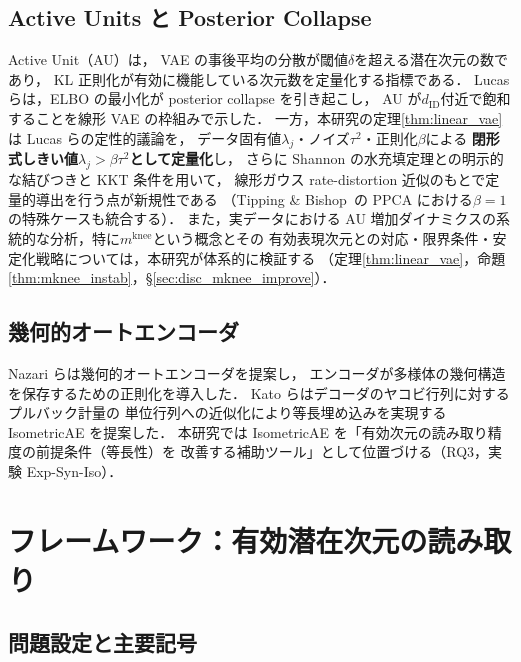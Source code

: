\documentclass[11pt,a4paper]{jsarticle}
\newcommand{\mknee}{m^{\mathrm{knee}}}
\begin{document}
\subsection{Active Units と Posterior Collapse}\label{sec:related_au}

Active Unit（AU）\cite{lucas2019elbo,higgins2017betavae}は，
VAE の事後平均の分散が閾値$\delta$を超える潜在次元の数であり，
KL 正則化が有効に機能している次元数を定量化する指標である．
Lucas ら\cite{lucas2019elbo}は，ELBO の最小化が posterior collapse を引き起こし，
AU が$d_{\mathrm{ID}}$付近で飽和することを線形 VAE の枠組みで示した．
一方，本研究の定理\ref{thm:linear_vae}は Lucas らの定性的議論を，
データ固有値$\lambda_j$・ノイズ$\tau^2$・正則化$\beta$による
\textbf{閉形式しきい値$\lambda_j > \beta\tau^2$として定量化}し，
さらに Shannon の水充填定理との明示的な結びつきと KKT 条件を用いて，
線形ガウス rate-distortion 近似のもとで定量的導出を行う点が新規性である
（Tipping \& Bishop~\cite{tippingbishop1999ppca}の PPCA における$\beta=1$の特殊ケースも統合する）．
また，実データにおける AU 増加ダイナミクスの系統的な分析，特に$\mknee$という概念とその
有効表現次元との対応・限界条件・安定化戦略については，本研究が体系的に検証する
（定理\ref{thm:linear_vae}，命題\ref{thm:mknee_instab}，§\ref{sec:disc_mknee_improve}）．

\subsection{幾何的オートエンコーダ}\label{sec:related_geo}

Nazari ら\cite{nazari2023geometric}は幾何的オートエンコーダを提案し，
エンコーダが多様体の幾何構造を保存するための正則化を導入した．
Kato ら\cite{kato2020rdae}はデコーダのヤコビ行列に対するプルバック計量の
単位行列への近似化により等長埋め込みを実現する IsometricAE を提案した．
本研究では IsometricAE を「有効次元の読み取り精度の前提条件（等長性）を
改善する補助ツール」として位置づける（RQ3，実験 Exp-Syn-Iso）．

\section{フレームワーク：有効潜在次元の読み取り}\label{sec:framework}

\subsection{問題設定と主要記号}\label{sec:framework_setup}
\end{document}
